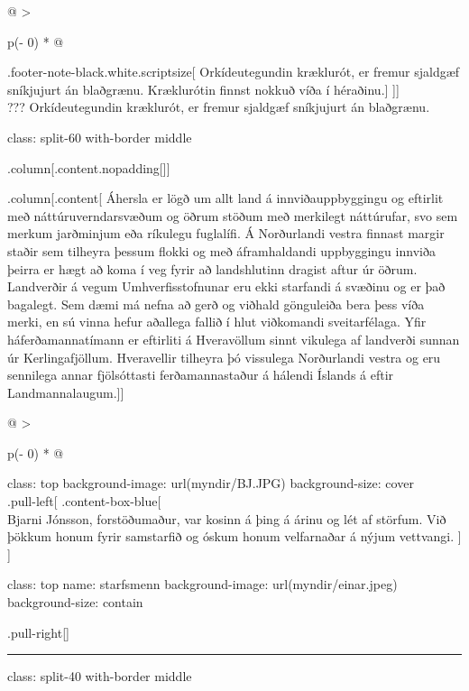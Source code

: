 \documentclass[
]{article}
\begin{document}
\begin{longtable}[]{@{}
  >{\raggedright\arraybackslash}p{(\columnwidth - 0\tabcolsep) * }@{}}
.footer-note-black.white.scriptsize{[} Orkídeutegundin kræklurót, er
fremur sjaldgæf sníkjujurt án blaðgrænu. Kræklurótin finnst nokkuð víða
í héraðinu.{]} {]}{]} \\
??? Orkídeutegundin kræklurót, er fremur sjaldgæf sníkjujurt án
blaðgrænu. \\
\bottomrule
\end{longtable}

class: split-60 with-border middle

.column{[}.content.nopadding{[}{]}{]}

.column{[}.content{[} Áhersla er lögð um allt land á innviðauppbyggingu
og eftirlit með náttúruverndarsvæðum og öðrum stöðum með merkilegt
náttúrufar, svo sem merkum jarðminjum eða ríkulegu fuglalífi. Á
Norðurlandi vestra finnast margir staðir sem tilheyra þessum flokki og
með áframhaldandi uppbyggingu innviða þeirra er hægt að koma í veg fyrir
að landshlutinn dragist aftur úr öðrum. Landverðir á vegum
Umhverfisstofnunar eru ekki starfandi á svæðinu og er það bagalegt. Sem
dæmi má nefna að gerð og viðhald gönguleiða bera þess víða merki, en sú
vinna hefur aðallega fallið í hlut viðkomandi sveitarfélaga. Yfir
háferðamannatímann er eftirliti á Hveravöllum sinnt vikulega af
landverði sunnan úr Kerlingafjöllum. Hveravellir tilheyra þó vissulega
Norðurlandi vestra og eru sennilega annar fjölsóttasti ferðamannastaður
á hálendi Íslands á eftir Landmannalaugum.{]}{]}

\begin{longtable}[]{@{}
  >{\raggedright\arraybackslash}p{(\columnwidth - 0\tabcolsep) * }@{}}
\toprule
\endhead
class: top background-image: url(myndir/BJ.JPG) background-size:
cover \\
.pull-left{[} .content-box-blue{[} \\
Bjarni Jónsson, forstöðumaður, var kosinn á þing á árinu og lét af
störfum. Við þökkum honum fyrir samstarfið og óskum honum velfarnaðar á
nýjum vettvangi. {]} {]} \\
\bottomrule
\end{longtable}

class: top name: starfsmenn background-image: url(myndir/einar.jpeg)
background-size: contain

.pull-right{[}{]}

\begin{center}\rule{0.5\linewidth}{0.5pt}\end{center}

class: split-40 with-border middle
\end{document}
